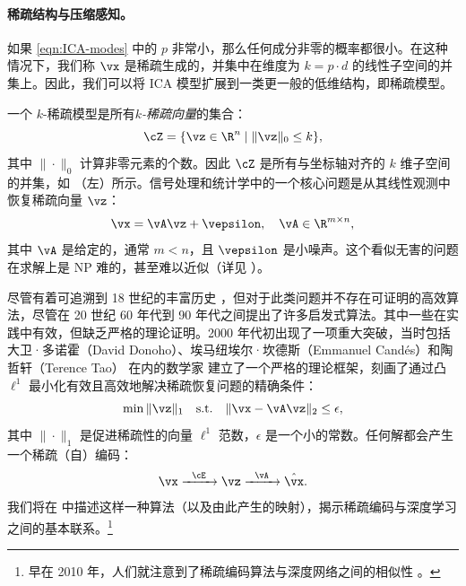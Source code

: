 \documentclass[../../book-main_zh.tex]{subfiles}
\begin{document}
\paragraph{稀疏结构与压缩感知。}
如果 \eqref{eqn:ICA-modes} 中的 \(p\) 非常小，那么任何成分非零的概率都很小。在这种情况下，我们称
\(\vx\) 是稀疏生成的，并集中在维度为 \(k = p \cdot d\) 的线性子空间的并集上。因此，我们可以将 ICA
模型扩展到一类更一般的低维结构，即稀疏模型。

一个 \(k\)-稀疏模型是所有\textit{\(k\)-稀疏向量}的集合：
\begin{equation}
    \cZ = \{\vz \in \R^{n} \mid \|\vz\|_{0} \leq k\},
\end{equation}
其中 \(\|\cdot\|_{0}\) 计算非零元素的个数。因此 \(\cZ\) 是所有与坐标轴对齐的 \(k\) 维子空间的并集，如
（左）所示。信号处理和统计学中的一个核心问题是从其线性观测中恢复稀疏向量 \(\vz\)：
\begin{equation}
    \vx = \vA \vz + \vepsilon, \quad \vA \in \R^{m\times n},
    \label{eqn:sparse-model}
\end{equation}
其中 \(\vA\) 是给定的，通常 \(m < n\)，且 \(\vepsilon\) 是小噪声。这个看似无害的问题在求解上是 NP
难的，甚至难以近似（详见 \cite{Wright-Ma-2022}）。

尽管有着可追溯到 18 世纪的丰富历史 \cite{Boscovichca1750}，但对于此类问题并不存在可证明的高效算法，尽管在 20
世纪 60 年代到 90 年代之间提出了许多启发式算法。其中一些在实践中有效，但缺乏严格的理论证明。2000
年代初出现了一项重大突破，当时包括大卫·多诺霍（David Donoho）、埃马纽埃尔·坎德斯（Emmanuel Cand\'{e}s）和陶哲轩（Terence Tao）
在内的数学家 \cite{donoho2005neighborly,Candes2005,CandesE2005-IT}
建立了一个严格的理论框架，刻画了通过凸 \(\ell^{1}\) 最小化有效且高效地解决稀疏恢复问题的精确条件：
\begin{equation}
    \min \|\vz\|_{1} \quad \mathrm{s.t.} \quad \|\vx -
    \vA\vz\|_{2} \leq \epsilon,
\end{equation}
其中 \(\|\cdot\|_{1}\) 是促进稀疏性的向量 \(\ell^{1}\) 范数，\(\epsilon\)
是一个小的常数。任何解都会产生一个稀疏（自）编码：
\begin{equation}
    \vx \xrightarrow{\hspace{2mm} \cE \hspace{2mm}} \vz
    \xrightarrow{\hspace{2mm} \vA \hspace{2mm}} \hat{\vx}.
    \label{eqn:decoding-sparse}
\end{equation}
我们将在 
中描述这样一种算法（以及由此产生的映射），揭示稀疏编码与深度学习之间的基本联系。\footnote{早在 2010
年，人们就注意到了稀疏编码算法与深度网络之间的相似性 \cite{gregor2010learning}。}
\end{document}
